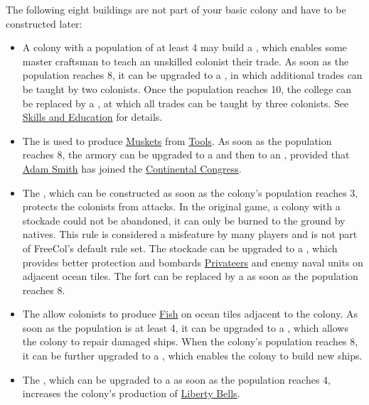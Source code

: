 \documentclass[12pt]{book}
\begin{document}
The following eight buildings are not part of your basic colony and
have to be constructed later:

\begin{itemize}
\item A colony with a population of at least 4 may build a
  , which enables some master craftsman to teach
  an unskilled colonist their trade. As soon as the population reaches
  8, it can be upgraded to a , in which additional
  trades can be taught by two colonists. Once the population reaches
  10, the college can be replaced by a , at which
  all trades can be taught by three colonists. See \hyperlink{Skills
  and Education}{Skills and Education} for details.

\item The  is used to produce
  \hyperlink{Muskets}{Muskets} from \hyperlink{Tools}{Tools}. As soon
  as the population reaches 8, the armory can be upgraded to a
   and then to an , provided that
  \hyperlink{Adam Smith}{Adam Smith} has joined the
  \hyperlink{Continental Congress}{Continental Congress}.

\item The , which can be constructed as soon as the
  colony's population reaches 3, protects the colonists from
  attacks. In the original game, a colony with a stockade could not be
  abandoned, it can only be burned to the ground by natives. This rule
  is considered a misfeature by many players and is not part of
  FreeCol's default rule set. The stockade can be upgraded to a
  , which provides better protection and bombards
  \hyperlink{Privateer}{Privateers} and enemy naval units on adjacent
  ocean tiles. The fort can be replaced by a  as
  soon as the population reaches 8.

\item The  allow colonists to produce
  \hyperlink{Fish}{Fish} on ocean tiles adjacent to the colony. As
  soon as the population is at least 4, it can be upgraded to a
  , which allows the colony to repair damaged
  ships. When the colony's population reaches 8, it can be further
  upgraded to a , which enables the colony to build
  new ships.

\item The , which can be upgraded to a
   as soon as the population reaches 4, increases
  the colony's production of \hyperlink{Liberty Bells}{Liberty Bells}.


\end{itemize}
\end{document}
